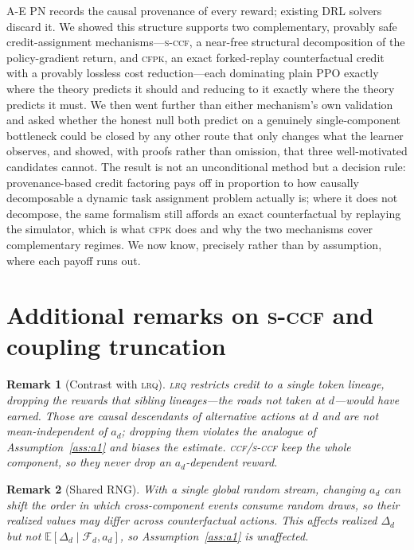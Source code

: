 \documentclass[review,authoryear,3p,times]{elsarticle}
\newtheorem{remark}{Remark}
\newcommand{\ccf}{\textsc{ccf}}
\newcommand{\sccf}{\textsc{s-ccf}}
\newcommand{\lrq}{\textsc{lrq}}
\newcommand{\cfpk}{\textsc{cfpk}}
\newcommand{\Fscr}{\mathcal{F}}
\newcommand{\Ex}{\mathbb{E}}
\begin{document}
A-E PN records the causal provenance of every reward; existing DRL solvers
discard it. We showed this structure supports two complementary, provably
safe credit-assignment mechanisms---\sccf, a near-free structural
decomposition of the policy-gradient return, and \cfpk, an exact
forked-replay counterfactual credit with a provably lossless cost
reduction---each dominating plain PPO exactly where the theory predicts it
should and reducing to it exactly where the theory predicts it must. We then
went further than either mechanism's own validation and asked whether the
honest null both predict on a genuinely single-component bottleneck could be
closed by any other route that only changes what the learner observes, and
showed, with proofs rather than omission, that three well-motivated
candidates cannot. The result is not an unconditional method but a decision
rule: provenance-based credit factoring pays off in proportion to how
causally decomposable a dynamic task assignment problem actually is; where it
does not decompose, the same formalism still affords an exact counterfactual
by replaying the simulator, which is what \cfpk{} does and why the two
mechanisms cover complementary regimes. We now know, precisely rather than by
assumption, where each payoff runs out.




\appendix
\section{Additional remarks on \sccf{} and coupling truncation}
\label{app:remarks}

\begin{remark}[Contrast with \lrq]
\lrq{} restricts credit to a single token lineage, dropping the rewards that
sibling lineages---the roads not taken at $d$---would have earned. Those are
causal descendants of alternative actions at $d$ and are not
mean-independent of $a_d$; dropping them violates the analogue of
Assumption~\ref{ass:a1} and biases the estimate. \ccf/\sccf{} keep the whole
component, so they never drop an $a_d$-dependent reward.
\end{remark}

\begin{remark}[Shared RNG]
With a single global random stream, changing $a_d$ can shift the order in
which cross-component events consume random draws, so their realized values
may differ across counterfactual actions. This affects realized $\Delta_d$
but not $\Ex[\Delta_d\mid\Fscr_d,a_d]$, so Assumption~\ref{ass:a1} is
unaffected.
\end{remark}
\end{document}
